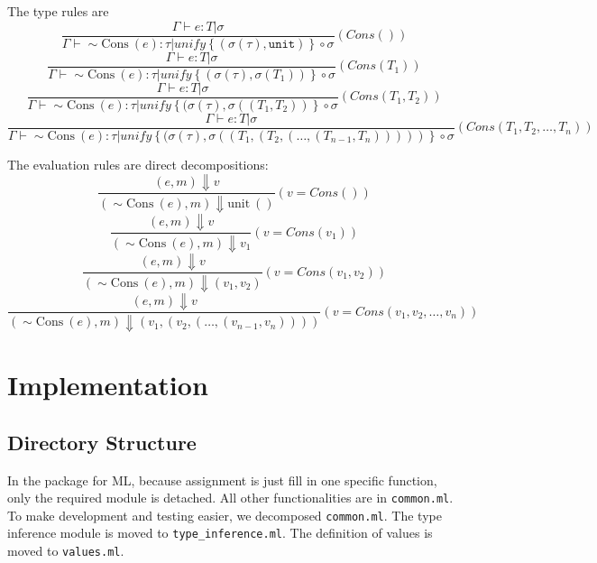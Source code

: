 \documentclass[a4paper,12pt]{article}
\begin{document}
		The type rules are
		\begin{equation*}
			\frac{
				\Gamma \vdash e: T |\sigma
			}{
				\Gamma \vdash \sim\mathrm{Cons\ } (e): \tau | \mathit{unify}\left\{ (\sigma(\tau), \mathtt{unit}) \right\} \circ \sigma
			}(Cons ())
		\end{equation*}
		\begin{equation*}
			\frac{
				\Gamma \vdash e: T |\sigma
			}{
				\Gamma \vdash \sim\mathrm{Cons\ } (e): \tau | \mathit{unify}\left\{ (\sigma(\tau), \sigma(T_1)) \right\} \circ \sigma
			}(Cons (T_1))
		\end{equation*}
		\begin{equation*}
		\frac{
			\Gamma \vdash e: T |\sigma
		}{
			\Gamma \vdash \sim\mathrm{Cons\ } (e): \tau | \mathit{unify}\left\{ (\sigma(\tau), \sigma((T_1, T_2)) \right\} \circ \sigma
		}(Cons (T_1, T_2))
		\end{equation*}
		\begin{equation*}
		\frac{
			\Gamma \vdash e: T |\sigma
		}{
			\Gamma \vdash \sim\mathrm{Cons\ } (e): \tau | \mathit{unify}\left\{ (\sigma(\tau), \sigma((T_1, (T_2, (\dots, (T_{n-1}, T_n))))) \right\} \circ \sigma
		}(Cons (T_1, T_2, \dots, T_n))
		\end{equation*}
		
		The evaluation rules are direct decompositions:
		\begin{equation*}
			\frac{
				(e, m) \Downarrow v
			}{
				(\sim\mathrm{Cons\ } (e), m) \Downarrow \mathrm{unit\ ()}
			}(v = Cons ())
		\end{equation*}
		\begin{equation*}
			\frac{
				(e, m) \Downarrow v
			}{
				(\sim\mathrm{Cons\ } (e), m) \Downarrow v_1
			}(v = Cons (v_1))
		\end{equation*}
		\begin{equation*}
			\frac{
				(e, m) \Downarrow v
			}{
				(\sim\mathrm{Cons\ } (e), m) \Downarrow (v_1, v_2)
			}(v = Cons (v_1, v_2))
		\end{equation*}
		\begin{equation*}
			\frac{
				(e, m) \Downarrow v
			}{
				(\sim\mathrm{Cons\ } (e), m) \Downarrow (v_1, (v_2, (\dots, (v_{n-1}, v_n))))
			}(v = Cons (v_1, v_2, \dots, v_n))
		\end{equation*}

\section{Implementation}
	\subsection{Directory Structure}
		In the package for ML, because assignment is just fill in one specific function, only the required module is detached. All other functionalities are in \texttt{common.ml}. To make development and testing easier, we decomposed \texttt{common.ml}. The type inference module is moved to \texttt{type\_inference.ml}. The definition of values is moved to \texttt{values.ml}.
		
\end{document}
